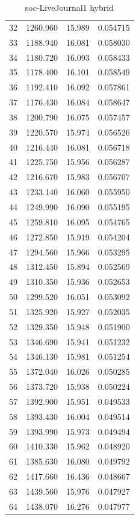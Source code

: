 \documentclass[10pt,twocolumn,letterpaper]{article}
\begin{document}
\begin{table}[h]
\begin{tabular}{@{}c|ccc@{}}
32 & 1260.960 & 15.989 & 0.054715 \\
33 & 1188.940 & 16.081 & 0.058030 \\
34 & 1180.720 & 16.093 & 0.058433 \\
35 & 1178.400 & 16.101 & 0.058549 \\
36 & 1192.410 & 16.092 & 0.057861 \\
37 & 1176.430 & 16.084 & 0.058647 \\
38 & 1200.790 & 16.075 & 0.057457 \\
39 & 1220.570 & 15.974 & 0.056526 \\
40 & 1216.440 & 16.081 & 0.056718 \\
41 & 1225.750 & 15.956 & 0.056287 \\
42 & 1216.670 & 15.983 & 0.056707 \\
43 & 1233.140 & 16.060 & 0.055950 \\
44 & 1249.990 & 16.090 & 0.055195 \\
45 & 1259.810 & 16.095 & 0.054765 \\
46 & 1272.850 & 15.919 & 0.054204 \\
47 & 1294.560 & 15.966 & 0.053295 \\
48 & 1312.450 & 15.894 & 0.052569 \\
49 & 1310.350 & 15.936 & 0.052653 \\
50 & 1299.520 & 16.051 & 0.053092 \\
51 & 1325.920 & 15.927 & 0.052035 \\
52 & 1329.350 & 15.948 & 0.051900 \\
53 & 1346.690 & 15.941 & 0.051232 \\
54 & 1346.130 & 15.981 & 0.051254 \\
55 & 1372.040 & 16.026 & 0.050285 \\
56 & 1373.720 & 15.938 & 0.050224 \\
57 & 1392.900 & 15.951 & 0.049533 \\
58 & 1393.430 & 16.004 & 0.049514 \\
59 & 1393.990 & 15.973 & 0.049494 \\
60 & 1410.330 & 15.962 & 0.048920 \\
61 & 1385.630 & 16.080 & 0.049792 \\
62 & 1417.660 & 16.436 & 0.048667 \\
63 & 1439.560 & 15.976 & 0.047927 \\
64 & 1438.070 & 16.276 & 0.047977 \\
\bottomrule
\end{tabular}
\caption{soc-LiveJournal1 hybrid}
\end{table}
\end{document}
